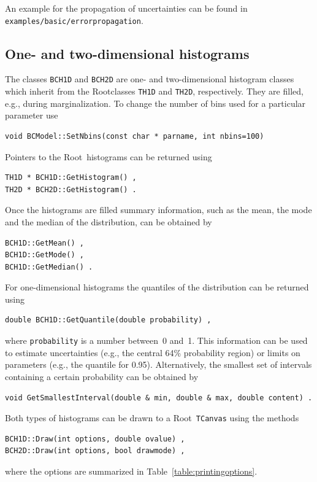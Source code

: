 \documentclass[11pt, a4paper]{article}
\newcommand{\Root}{{\sc Root}}
\begin{document}
\noindent
An example for the propagation of uncertainties can be found in
\linebreak \verb|examples/basic/errorpropagation|.


\subsection{One- and two-dimensional histograms}

The classes \verb|BCH1D| and \verb|BCH2D| are one- and two-dimensional
histogram classes which inherit from the \Root\-classes \verb|TH1D|
and \verb|TH2D|, respectively. They are filled, e.g., during
marginalization. To change the number of bins used for a particular parameter
use
%
\begin{verbatim}
void BCModel::SetNbins(const char * parname, int nbins=100)
\end{verbatim}
%
Pointers to the \Root\ histograms can be returned
using
%
\begin{verbatim}
TH1D * BCH1D::GetHistogram() ,
TH2D * BCH2D::GetHistogram() .
\end{verbatim}
%
Once the histograms are filled summary information, such as the mean,
the mode and the median of the distribution, can be obtained by
%
\begin{verbatim}
BCH1D::GetMean() ,
BCH1D::GetMode() ,
BCH1D::GetMedian() .
\end{verbatim}
%
For one-dimensional histograms the quantiles of the distribution can
be returned using
%
\begin{verbatim}
double BCH1D::GetQuantile(double probability) ,
\end{verbatim}
%
where \verb|probability| is a number between~0 and~1. This information
can be used to estimate uncertainties (e.g., the central 64\%
probability region) or limits on parameters (e.g., the quantile for
0.95). Alternatively, the smallest set of intervals containing a
certain probability can be obtained by
%
\begin{verbatim}
void GetSmallestInterval(double & min, double & max, double content) .
\end{verbatim}

\noindent
Both types of histograms can be drawn to a \Root\ \verb|TCanvas| using
the methods
%
\begin{verbatim}
BCH1D::Draw(int options, double ovalue) ,
BCH2D::Draw(int options, bool drawmode) ,
\end{verbatim}
%
where the options are summarized in Table~\ref{table:printingoptions}.
\end{document}
